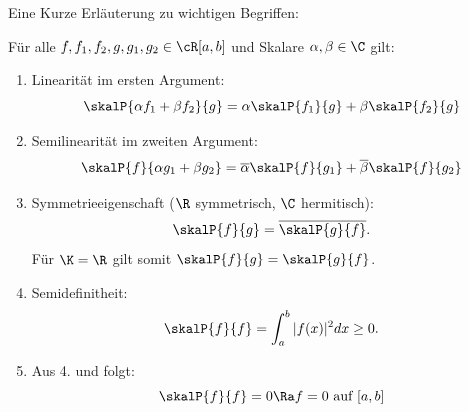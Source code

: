 \begin{bemerkungbox}
    Eine Kurze Erläuterung zu wichtigen Begriffen:

    Für alle $f,f_1,f_2,g,g_1,g_2 \in \cR[a,b]$ und Skalare $\alpha,\beta \in \C$ gilt:
    \begin{enumerate}
        \item Linearität im ersten Argument:
        $$
            \skalP{\alpha f_1 + \beta f_2}{g}
            = \alpha\skalP{f_1}{g} + \beta \skalP{f_2}{g}
        $$
        \item Semilinearität im zweiten Argument:
        $$
            \skalP{f}{\alpha g_1 + \beta g_2}
            = \overline{\alpha}\skalP{f}{g_1} + \overline{\beta}\skalP{f}{g_2}
        $$
        \item Symmetrieeigenschaft ($\R$ symmetrisch,  $\C$ hermitisch):
        $$
            \skalP{f}{g} = \overline{\skalP{g}{f}}.
        $$
        Für $\K = \R$ gilt somit $\skalP{f}{g} = \skalP{g}{f}$.
        \item Semidefinitheit:
        $$
            \skalP{f}{f} = \int_a^b |f(x)|^2dx \ge 0.
        $$
        \item Aus 4. und  folgt:
        $$
            \skalP{f}{f} = 0 \Ra f=0 \text{ auf } [a,b]
        $$
    \end{enumerate}
\end{bemerkungbox}

